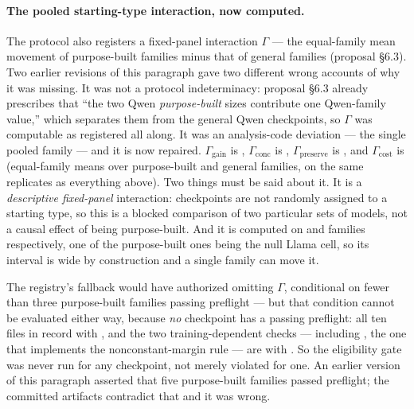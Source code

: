 \paragraph{The pooled starting-type interaction, now computed.} The protocol also registers a
fixed-panel interaction $\Gamma$ --- the equal-family mean movement of purpose-built families minus
that of general families (proposal \S6.3). Two earlier revisions of this paragraph gave two different
wrong accounts of why it was missing. It was not a protocol indeterminacy: proposal \S6.3 already
prescribes that ``the two Qwen \emph{purpose-built} sizes contribute one Qwen-family value,'' which
separates them from the general Qwen checkpoints, so $\Gamma$ was computable as registered all along.
It was an analysis-code deviation --- the single pooled  family --- and it is now repaired.
$\Gamma_{\mathrm{gain}}$ is \AdaGammaGain{} \AdaGammaGainCI, $\Gamma_{\mathrm{conc}}$ is
\AdaGammaConc{} \AdaGammaConcCI, $\Gamma_{\mathrm{preserve}}$ is \AdaGammaPreserve{}
\AdaGammaPreserveCI, and $\Gamma_{\mathrm{cost}}$ is \AdaGammaCost{} \AdaGammaCostCI{} (equal-family
means over \AdaNFamiliesPB{} purpose-built and \AdaNFamiliesGen{} general families, on the same
replicates as everything above). Two things must be said about it. It is a \emph{descriptive
fixed-panel} interaction: checkpoints are not randomly assigned to a starting type, so this is a
blocked comparison of two particular sets of models, not a causal effect of being purpose-built. And it
is computed on \AdaNFamiliesPB{} and \AdaNFamiliesGen{} families respectively, one of the purpose-built ones being
the null Llama cell, so its interval is wide by construction and a single family can move it.

The registry's  fallback would have authorized omitting $\Gamma$, conditional
on fewer than three purpose-built families passing preflight --- but that condition cannot be evaluated
either way, because \emph{no} checkpoint has a passing preflight: all ten files in
\allowbreak{}\allowbreak{} record
 with
, and the two training-dependent checks --- including
, the one that implements the nonconstant-margin rule --- are
 with . So the eligibility gate was never run for
any checkpoint, not merely violated for one. An earlier version of this paragraph asserted that five
purpose-built families passed preflight; the committed artifacts contradict that and it was wrong.


